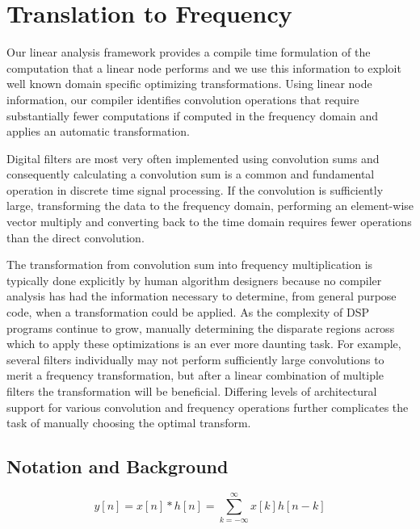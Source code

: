 
\section{Translation to Frequency}
\label{sec:freq}

Our linear analysis framework provides a compile time formulation of
the computation that a linear node performs and we use this
information to exploit well known domain specific optimizing
transformations. Using linear node information, our compiler
identifies convolution operations that require substantially fewer
computations if computed in the frequency domain and applies
an automatic transformation.

Digital filters are most very often implemented using convolution sums
and consequently calculating a convolution sum is a common and fundamental 
operation in discrete time signal processing. If the convolution is
sufficiently large, transforming the data to the frequency domain,
performing an element-wise vector multiply and converting back to the time
domain requires fewer operations than the direct convolution.

The transformation from convolution sum into frequency multiplication
is typically done explicitly by human algorithm designers because no 
compiler analysis has had the information necessary to determine, from 
general purpose code, when a transformation could be applied. 
As the complexity of DSP programs continue to grow, manually 
determining the disparate regions across which 
to apply these optimizations is an ever more daunting task. 
For example, several filters individually may not perform sufficiently large 
convolutions to merit a frequency transformation, but after a linear 
combination of multiple filters the transformation will be beneficial.
Differing levels of architectural support for various convolution and 
frequency operations further complicates the task of manually choosing
the optimal transform.

\subsection{Notation and Background}
\label{sec:method-opt-notation}

\begin{equation}
\label{eqn:conv-sum-again}
y[n]=x[n]*h[n]=\sum_{k=-\infty}^{\infty}x[k]h[n-k]
\end{equation}

